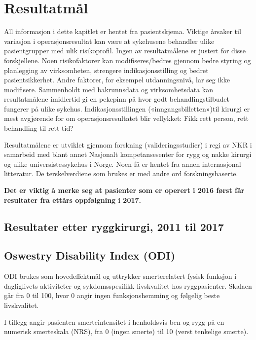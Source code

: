 \documentclass [norsk,a4paper,twoside]{article}\usepackage[]{graphicx}\usepackage[]{color}
\begin{document}
\section{Resultatmål}
All informasjon i dette kapitlet er hentet fra pasientskjema.  Viktige årsaker til variasjon i operasjonsresultat kan være at sykehusene behandler
ulike pasientgrupper med ulik risikoprofil. Ingen av resultatmålene er justert
for disse forskjellene. Noen risikofaktorer kan modifiseres/bedres gjennom bedre styring og planlegging av
virksomheten, strengere indikasjonsstilling og bedret pasientsikkerhet. Andre faktorer, for eksempel utdanningsnivå, lar seg ikke modifisere.
Sammenholdt med bakrunnsdata og virksomhetsdata kan resultatmålene imidlertid gi en pekepinn på hvor godt behandlingstilbudet fungerer på ulike sykehus. Indikasjonsstillingen («inngangsbilletten»)til kirurgi er mest avgjørende for om operasjonsresultatet blir vellykket: Fikk rett person, rett
behandling til rett tid?

Resultatmålene er utviklet gjennom forskning (valideringsstudier) i regi av NKR i samarbeid
med blant annet Nasjonalt kompetansesenter for rygg og nakke kirurgi og ulike universistessykehus i Norge. Noen få er hentet fra annen
internasjonal litteratur. De terskelverdiene som brukes er med andre ord forskningsbaserte.
 
\textbf{Det er viktig å merke seg at pasienter som er operert i 2016 først får resultater fra ettårs oppfølgning i 2017.} 


      
      


      
      \subsection{ Resultater etter ryggkirurgi, 2011 til 2017}

\subsection{Oswestry Disability Index (ODI)}


      
      
      
      ODI brukes som hovedeffektmål og uttrykker smerterelatert  fysisk funksjon i dagliglivets aktiviteter og sykdomsspesifikk livskvalitet hos ryggpasienter. Skalaen går fra 0
til 100, hvor 0 angir ingen funksjonshemming og følgelig beste livskvalitet.

I tillegg angir pasienten smerteintensitet i henholdsvis ben og rygg på en numerisk smerteskala (NRS), 
fra 0 (ingen smerte) til 10 (verst tenkelige smerte).
\\
\end{document}
